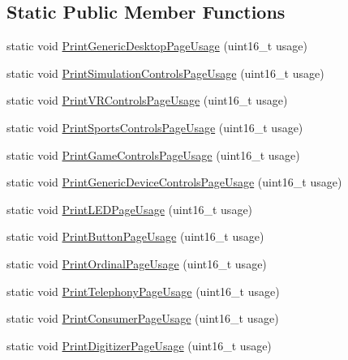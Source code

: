 \subsection*{\-Static \-Public \-Member \-Functions}
\begin{DoxyCompactItemize}
\item 
static void \hyperlink{class_report_desc_parser_base_a3eff46688f9edbee3a58c43bbf104763}{\-Print\-Generic\-Desktop\-Page\-Usage} (uint16\-\_\-t usage)
\item 
static void \hyperlink{class_report_desc_parser_base_aa316c748b795fbe80cdd2f69e83c7ae4}{\-Print\-Simulation\-Controls\-Page\-Usage} (uint16\-\_\-t usage)
\item 
static void \hyperlink{class_report_desc_parser_base_a938d53101e5ab4e5831276efb298fea9}{\-Print\-V\-R\-Controls\-Page\-Usage} (uint16\-\_\-t usage)
\item 
static void \hyperlink{class_report_desc_parser_base_a3db34bff0d14731df402a20fb67838d9}{\-Print\-Sports\-Controls\-Page\-Usage} (uint16\-\_\-t usage)
\item 
static void \hyperlink{class_report_desc_parser_base_a4e026cfeda7bfe9e07cf247cbcc4a122}{\-Print\-Game\-Controls\-Page\-Usage} (uint16\-\_\-t usage)
\item 
static void \hyperlink{class_report_desc_parser_base_a1b5cb93a83e2212319fe30f1a1636478}{\-Print\-Generic\-Device\-Controls\-Page\-Usage} (uint16\-\_\-t usage)
\item 
static void \hyperlink{class_report_desc_parser_base_af86c8a065849b37590d88f68be85e293}{\-Print\-L\-E\-D\-Page\-Usage} (uint16\-\_\-t usage)
\item 
static void \hyperlink{class_report_desc_parser_base_a928f2b689012051dfe20e46bd7b21ed3}{\-Print\-Button\-Page\-Usage} (uint16\-\_\-t usage)
\item 
static void \hyperlink{class_report_desc_parser_base_a1b0cc07f038faef88431c87065370dce}{\-Print\-Ordinal\-Page\-Usage} (uint16\-\_\-t usage)
\item 
static void \hyperlink{class_report_desc_parser_base_ac01bf8776f485b478c3bb64887e446b4}{\-Print\-Telephony\-Page\-Usage} (uint16\-\_\-t usage)
\item 
static void \hyperlink{class_report_desc_parser_base_a9af1dc144bab9e9864394594be67d2eb}{\-Print\-Consumer\-Page\-Usage} (uint16\-\_\-t usage)
\item 
static void \hyperlink{class_report_desc_parser_base_aa62d11cfe404ee51ffd26f13c33800a1}{\-Print\-Digitizer\-Page\-Usage} (uint16\-\_\-t usage)

\end{DoxyCompactItemize}
